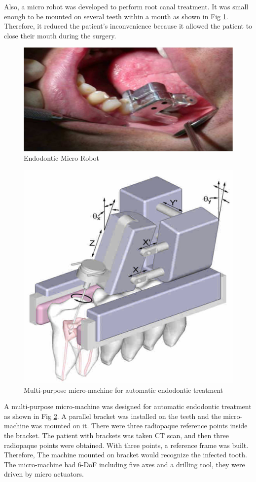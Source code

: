 \par
Also, a micro robot was developed to perform root canal treatment. It was small enough to be mounted on several teeth within a mouth as shown in Fig \ref{fig:NCTU_4}. Therefore, it reduced the patient's inconvenience because it allowed the patient to close their mouth during the surgery.
\begin{figure}[htbp]
\begin{center}
	\includegraphics[width=0.9\linewidth]{Images/NCTU_4.png}
	\caption[Endodontic Micro Robot]{Endodontic Micro Robot \cite{dong2006wip}}	
	\label{fig:NCTU_4}
\end{center}
\end{figure}
\begin{figure}[htbp]
\begin{center}
	\includegraphics[width=0.6\linewidth]{Images/NCTU_1.png}
	\caption[Multi-purpose micro-machine for automatic endodontic treatment]{
Multi-purpose micro-machine for automatic endodontic treatment \cite{dong2006wip}
}\label{fig:NCTU_1}
\end{center}
\end{figure}
\par
A multi-purpose micro-machine was designed for automatic endodontic treatment as shown in Fig \ref{fig:NCTU_1}. A parallel bracket was installed on the teeth and the micro-machine was mounted on it. There were three radiopaque reference points inside the bracket. The patient with brackets was taken CT scan, and then three radiopaque points were obtained. With three points, a reference frame was built. Therefore, The machine mounted on bracket would recognize the infected tooth. The micro-machine had 6-DoF including five axes and a drilling tool, they were driven by micro actuators.

